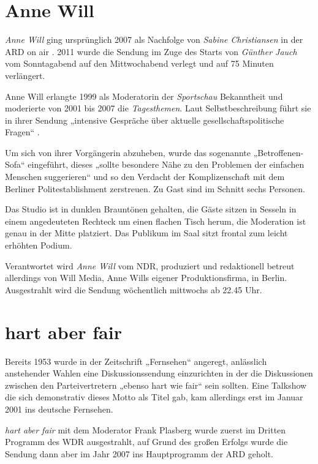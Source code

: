 \section{Anne Will}

\textit{Anne Will} ging ursprünglich 2007 als Nachfolge von \textit{Sabine Christiansen} in der ARD on air \parencite[19]{gaeblerUndUnserenTaeglichen2011}. 2011 wurde die Sendung im Zuge des Starts von \textit{Günther Jauch} vom Sonntagabend auf den Mittwochabend verlegt und auf 75 Minuten verlängert.

Anne Will erlangte 1999 als Moderatorin der \textit{Sportschau} Bekanntheit und moderierte von 2001 bis 2007 die \textit{Tagesthemen}. Laut Selbstbeschreibung führt sie in ihrer Sendung „intensive Gespräche über aktuelle gesellschaftspolitische Fragen“ \parencite{ardAnneWillPersoenlicho.J.}.

Um sich von ihrer Vorgängerin abzuheben, wurde das sogenannte „Betroffenen-Sofa“ eingeführt, dieses „sollte besondere Nähe zu den Problemen der einfachen Menschen suggerieren“ \parencite[20]{gaeblerUndUnserenTaeglichen2011} und so den Verdacht der Komplizenschaft mit dem Berliner Politestablishment zerstreuen. Zu Gast sind im Schnitt sechs Personen.

Das Studio ist in dunklen Brauntönen gehalten, die Gäste sitzen in Sesseln in einem angedeuteten Rechteck um einen flachen Tisch herum, die Moderation ist genau in der Mitte platziert. Das Publikum im Saal sitzt frontal zum leicht erhöhten Podium.

Verantwortet wird \textit{Anne Will} vom NDR, produziert und redaktionell betreut allerdings von Will Media, Anne Wills eigener Produktionsfirma, in Berlin. Ausgestrahlt wird die Sendung wöchentlich mittwochs ab 22.45 Uhr.

\section{hart aber fair}\label{chap:hartaberfair}

Bereits 1953 wurde in der Zeitschrift „Fernsehen“ angeregt, anlässlich anstehender Wahlen eine Diskussionssendung einzurichten in der die Diskussionen zwischen den Parteivertretern „ebenso hart wie fair“ \parencites[353]{o.a.LebendigeWahlsendungen1953}[zit. nach][124]{kellerGeschichteTalkshowDeutschland2009}  sein sollten. Eine Talkshow die sich demonstrativ dieses Motto als Titel gab, kam allerdings erst im Januar 2001 ins deutsche Fernsehen.

\textit{hart aber fair} mit dem Moderator Frank Plasberg wurde zuerst im Dritten Programm des WDR ausgestrahlt, auf Grund des großen Erfolgs wurde die Sendung dann aber im Jahr 2007 ins Hauptprogramm der ARD geholt.

